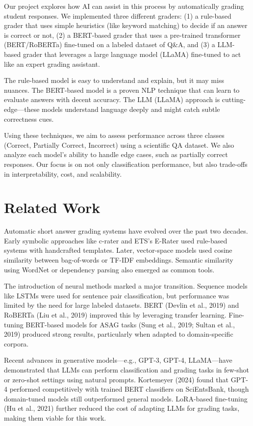 \documentclass[11pt]{article}
\begin{document}
Our project explores how AI can assist in this process by automatically grading student responses. We implemented three different graders: (1) a rule-based grader that uses simple heuristics (like keyword matching) to decide if an answer is correct or not, (2) a BERT-based grader that uses a pre-trained transformer (BERT/RoBERTa) fine-tuned on a labeled dataset of Q\&A, and (3) a LLM-based grader that leverages a large language model (LLaMA) fine-tuned to act like an expert grading assistant. 

The rule-based model is easy to understand and explain, but it may miss nuances. The BERT-based model is a proven NLP technique that can learn to evaluate answers with decent accuracy. The LLM (LLaMA) approach is cutting-edge—these models understand language deeply and might catch subtle correctness cues.

Using these techniques, we aim to assess performance across three classes (Correct, Partially Correct, Incorrect) using a scientific QA dataset. We also analyze each model’s ability to handle edge cases, such as partially correct responses. Our focus is on not only classification performance, but also trade-offs in interpretability, cost, and scalability.

\section{Related Work}
Automatic short answer grading systems have evolved over the past two decades. Early symbolic approaches like c-rater and ETS's E-Rater used rule-based systems with handcrafted templates. Later, vector-space models used cosine similarity between bag-of-words or TF-IDF embeddings. Semantic similarity using WordNet or dependency parsing also emerged as common tools.

The introduction of neural methods marked a major transition. Sequence models like LSTMs were used for sentence pair classification, but performance was limited by the need for large labeled datasets. BERT (Devlin et al., 2019) and RoBERTa (Liu et al., 2019) improved this by leveraging transfer learning. Fine-tuning BERT-based models for ASAG tasks (Sung et al., 2019; Sultan et al., 2019) produced strong results, particularly when adapted to domain-specific corpora.

Recent advances in generative models—e.g., GPT-3, GPT-4, LLaMA—have demonstrated that LLMs can perform classification and grading tasks in few-shot or zero-shot settings using natural prompts. Kortemeyer (2024) found that GPT-4 performed competitively with trained BERT classifiers on SciEntsBank, though domain-tuned models still outperformed general models. LoRA-based fine-tuning (Hu et al., 2021) further reduced the cost of adapting LLMs for grading tasks, making them viable for this work.
\end{document}
